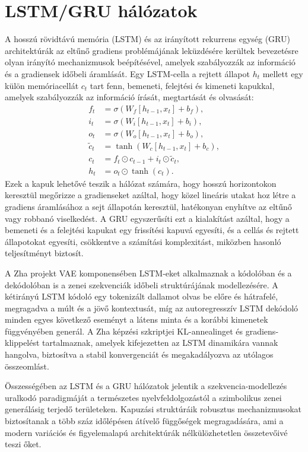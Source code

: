 \section{LSTM/GRU hálózatok}
A hosszú rövidtávú memória (LSTM) és az irányított rekurrens egység (GRU) architektúrák az eltűnő gradiens problémájának leküzdésére kerültek bevezetésre olyan irányító mechanizmusok beépítésével, amelyek szabályozzák az információ és a gradiensek időbeli áramlását. Egy LSTM-cella a rejtett állapot \(h_t\) mellett egy külön memóriacellát \(c_t\) tart fenn, bemeneti, felejtési és kimeneti kapukkal, amelyek szabályozzák az információ írását, megtartását és olvasását:
\[
\begin{aligned}
f_t &= \sigma(W_f[h_{t-1},x_t] + b_f),\\
i_t &= \sigma(W_i[h_{t-1},x_t] + b_i),\\
o_t &= \sigma(W_o[h_{t-1},x_t] + b_o),\\
\tilde{c}_t &= \tanh(W_c[h_{t-1},x_t] + b_c),\\
c_t &= f_t \odot c_{t-1} + i_t \odot \tilde{c}_t,\\
h_t &= o_t \odot \tanh(c_t).
\end{aligned}
\]
Ezek a kapuk lehetővé teszik a hálózat számára, hogy hosszú horizontokon keresztül megőrizze a gradienseket azáltal, hogy közel lineáris utakat hoz létre a gradiens áramlásához a sejt állapotán keresztül, hatékonyan enyhítve az eltűnő vagy robbanó viselkedést. A GRU egyszerűsíti ezt a kialakítást azáltal, hogy a bemeneti és a felejtési kapukat egy frissítési kapuvá egyesíti, és a cellás és rejtett állapotokat egyesíti, csökkentve a számítási komplexitást, miközben hasonló teljesítményt biztosít.

A Zha projekt VAE komponensében LSTM-eket alkalmaznak a kódolóban és a dekódolóban is a zenei szekvenciák időbeli struktúrájának modellezésére. A kétirányú LSTM kódoló egy tokenizált dallamot olvas be előre és hátrafelé, megragadva a múlt és a jövő kontextusát, míg az autoregresszív LSTM dekódoló minden egyes következő eseményt a látens minta és a korábbi kimenetek függvényében generál. A Zha képzési szkriptjei KL-annealinget és gradiens-klippelést tartalmaznak, amelyek kifejezetten az LSTM dinamikára vannak hangolva, biztosítva a stabil konvergenciát és megakadályozva az utólagos összeomlást.

Összességében az LSTM és a GRU hálózatok jelentik a szekvencia-modellezés uralkodó paradigmáját a természetes nyelvfeldolgozástól a szimbolikus zenei generálásig terjedő területeken.  Kapuzási struktúráik robusztus mechanizmusokat biztosítanak a több száz időlépésen átívelő függőségek megragadására, ami a modern variációs és figyelemalapú architektúrák nélkülözhetetlen összetevőivé teszi őket. 
